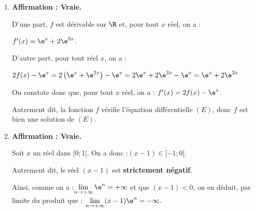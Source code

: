\begin{enumerate}
	On a alors : \quad
	$\begin{aligned}[t] \displaystyle
		J &= \int_{1}^{2} x\ln(x) ~\mathrm{dt} \\
		&= \int_{1}^{2} u'(x)\times v(x) ~\mathrm{dt} \quad \text{donc, par intégration par parties :}\\
		&= \Big[u(x) \times v(x)\Big]_1^2 - \int_{1}^{2} u(x)\times v'(x) ~\mathrm{dt} \\
		&= \left[\dfrac{1}{2}x^2 \times \ln(x) \right]_1^2 - \int_{1}^{2} \dfrac{1}{2}x^2\times \dfrac{1}{x} ~\mathrm{dt} \\
		&= \left(\dfrac{1}{2}\times 2^2 \times \ln(2)\right) - \left(\dfrac{1}{2}\times 1^2 \times \ln(1)\right) -\dfrac{1}{2} \int_{1}^{2} x~\mathrm{d}x\\
		&= 2 \ln(2) - 0 -\dfrac{1}{2} \left[\dfrac{1}{2}x^2\right]_{1}^{2}\\
		&= 2\ln(2) -\dfrac{1}{2}\left[\left(\dfrac{1}{2}\times 2^2\right) - \left(\dfrac{1}{2}\times 1^2\right)\right]\\
		&=2\ln(2) - \dfrac{3}{4} \approx \np{0,63629}
	\end{aligned}$

	Or $\dfrac{7}{11} \approx \np{0,63636}$, donc $J \neq \dfrac{7}{11}$.

	\item \textbf{Affirmation \theenumi : Vraie.}

D'une part, $f$ est dérivable sur $\R$ et, pour tout $x$ réel, on a :

$f'(x) = \e^{x} + 2\e^{2x}$.

D'autre part, pour tout réel $x$, on a :

$2f(x) - \e^{x} = 2\left(\e^{x} + \e^{2x}\right) - \e^{x} = 2\e^{x} + 2\e^{2x} - \e^{x} = \e^{x} + 2\e^{2x}$

On constate donc que, pour tout $x$ réel, on a : \quad $f'(x) = 2f(x) - \e^{x}$.

Autrement dit, la fonction $f$ vérifie l'équation différentielle $(E)$, donc $f$ est bien une solution de $(E)$.

	\item \textbf{Affirmation \theenumi : Vraie.}

Soit $x$ un réel dans $[0 ; 1[$. On a donc :\quad $(x - 1)\in [-1 ; 0[$.

Autrement dit, le réel $(x - 1)$ est \textbf{strictement négatif}.

Ainsi, comme on a :\quad $\lim\limits_{n \to +\infty} \e^{n} = +\infty$ \quad et que $(x-1)< 0$, on en déduit, par limite du produit que : \quad $\lim\limits_{n \to +\infty} (x-1) \e^{n} = -\infty$.


\end{enumerate}
